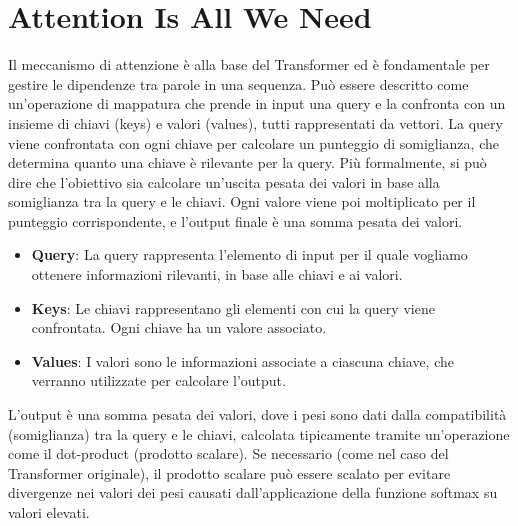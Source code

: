 \section{Attention Is All We Need}
Il meccanismo di attenzione è alla base del Transformer ed è fondamentale per gestire le dipendenze tra parole in una sequenza. Può essere descritto come un'operazione di mappatura che prende in input una query e la confronta con un insieme di chiavi (keys) e valori (values), tutti rappresentati da vettori. La query viene confrontata con ogni chiave per calcolare un punteggio di somiglianza, che determina quanto una chiave è rilevante per la query.
Più formalmente, si può dire che l'obiettivo sia calcolare un'uscita pesata dei valori in base alla somiglianza tra la query e le chiavi. Ogni valore viene poi moltiplicato per il punteggio corrispondente, e l'output finale è una somma pesata dei valori.
\begin{itemize}
	\item \textbf{Query}: La query rappresenta l'elemento di input per il quale vogliamo ottenere informazioni rilevanti, in base alle chiavi e ai valori.
	\item \textbf{Keys}: Le chiavi rappresentano gli elementi con cui la query viene confrontata. Ogni chiave ha un valore associato.
	\item \textbf{Values}: I valori sono le informazioni associate a ciascuna chiave, che verranno utilizzate per calcolare l'output.
\end{itemize}
L'output è una somma pesata dei valori, dove i pesi sono dati dalla compatibilità (somiglianza) tra la query e le chiavi, calcolata tipicamente tramite un'operazione come il dot-product (prodotto scalare).
Se necessario (come nel caso del Transformer originale), il prodotto scalare può essere scalato per evitare divergenze nei valori dei pesi causati dall'applicazione della funzione softmax su valori elevati.
